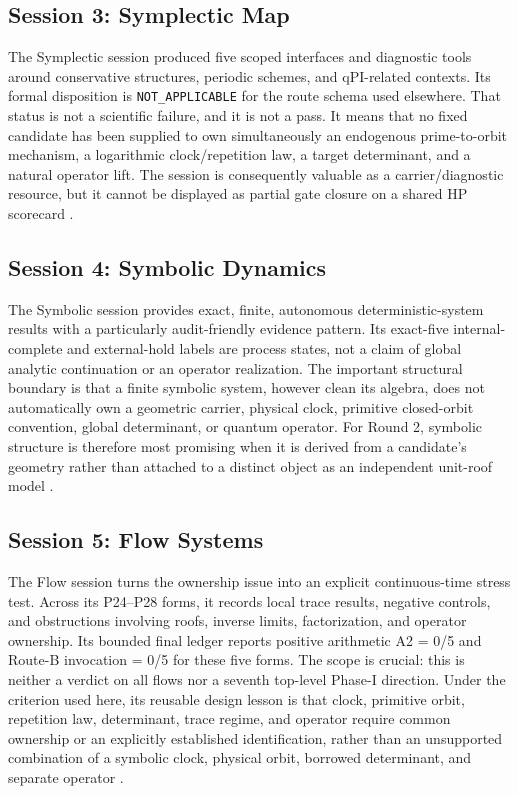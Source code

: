 \subsection{Session 3: Symplectic Map}

The Symplectic session produced five scoped interfaces and diagnostic tools
around conservative structures, periodic schemes, and qPI-related contexts.
Its formal disposition is \texttt{NOT\_APPLICABLE} for the route schema used
elsewhere. That status is not a scientific failure, and it is not a pass. It
means that no fixed candidate has been supplied to own simultaneously an
endogenous prime-to-orbit mechanism, a logarithmic clock/repetition law, a
target determinant, and a natural operator lift. The session is consequently
valuable as a carrier/diagnostic resource, but it cannot be displayed as
partial gate closure on a shared HP scorecard \citep{PhaseIRepository}.

\subsection{Session 4: Symbolic Dynamics}

The Symbolic session provides exact, finite, autonomous deterministic-system
results with a particularly audit-friendly evidence pattern. Its
exact-five internal-complete and external-hold labels are process states,
not a claim of global analytic continuation or an operator realization. The
important structural boundary is that a finite symbolic system, however clean
its algebra, does not automatically own a geometric carrier, physical clock,
primitive closed-orbit convention, global determinant, or quantum operator.
For Round 2, symbolic structure is therefore most promising when it is derived
from a candidate's geometry rather than attached to a distinct object as an
independent unit-roof model \citep{PhaseIRepository}.

\subsection{Session 5: Flow Systems}

The Flow session turns the ownership issue into an explicit continuous-time
stress test. Across its P24--P28 forms, it records local trace results,
negative controls, and obstructions involving roofs, inverse limits,
factorization, and operator ownership. Its bounded final ledger reports
positive arithmetic A2 = 0/5 and Route-B invocation = 0/5 for these five
forms. The scope is crucial: this is neither a verdict on all flows nor a
seventh top-level Phase-I direction. Under the \sameobject{} criterion used
here, its reusable design lesson is that clock, primitive orbit, repetition
law, determinant, trace regime, and operator require common ownership or an
explicitly established identification, rather than an unsupported combination
of a symbolic clock, physical orbit, borrowed determinant, and separate
operator \citep{PhaseIRepository}.


